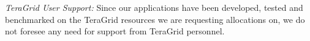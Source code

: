 \documentclass[a4paper,10pt]{article}
\begin{document}
{\it TeraGrid User Support:} Since our applications have been developed, tested and benchmarked on the TeraGrid resources
we are requesting allocations on, we do not foresee any need for support from TeraGrid personnel.








\end{document}
